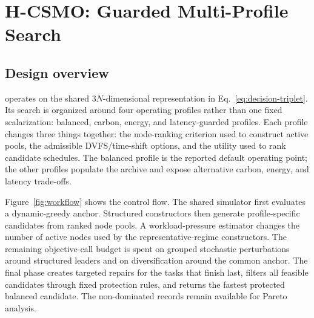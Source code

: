 \section{H-CSMO: Guarded Multi-Profile Search}
\label{sec:method}

\subsection{Design overview}

\method operates on the shared $3N$-dimensional representation in Eq.~\eqref{eq:decision-triplet}. Its search is organized around four operating profiles rather than one fixed scalarization: balanced, carbon, energy, and latency-guarded profiles. Each profile changes three things together: the node-ranking criterion used to construct active pools, the admissible DVFS/time-shift options, and the utility used to rank candidate schedules. The balanced profile is the reported default operating point; the other profiles populate the archive and expose alternative carbon, energy, and latency trade-offs.

Figure~\ref{fig:workflow} shows the control flow. The shared simulator first evaluates a dynamic-greedy anchor. Structured constructors then generate profile-specific candidates from ranked node pools. A workload-pressure estimator changes the number of active nodes used by the representative-regime constructors. The remaining objective-call budget is spent on grouped stochastic perturbations around structured leaders and on diversification around the common anchor. The final phase creates targeted repairs for the tasks that finish last, filters all feasible candidates through fixed protection rules, and returns the fastest protected balanced candidate. The non-dominated records remain available for Pareto analysis.

